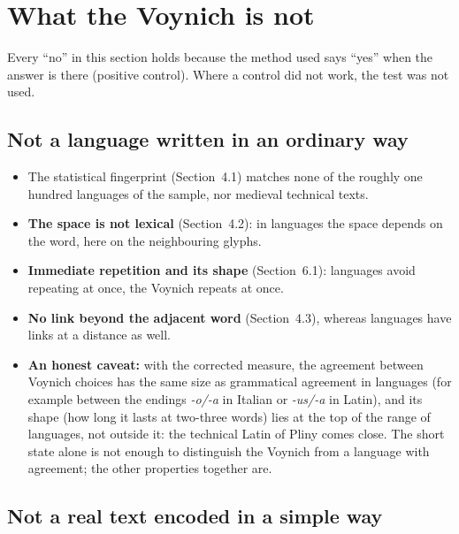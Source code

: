 \section{What the Voynich is not}

Every ``no'' in this section holds because the method used says ``yes'' when the answer is there (positive control).
Where a control did not work, the test was not used.

\subsection{Not a language written in an ordinary way}

\begin{itemize}
\item The statistical fingerprint (Section~4.1) matches none of the roughly one hundred languages of the sample, nor
  medieval technical texts.
\item \textbf{The space is not lexical} (Section~4.2): in languages the space depends on the word, here on the
  neighbouring glyphs.
\item \textbf{Immediate repetition and its shape} (Section~6.1): languages avoid repeating at once, the Voynich repeats at
  once.
\item \textbf{No link beyond the adjacent word} (Section~4.3), whereas languages have links at a distance as well.
\item \textbf{An honest caveat:} with the corrected measure, the agreement between Voynich choices has the same size as
  grammatical agreement in languages (for example between the endings \emph{-o/-a} in Italian or \emph{-us/-a} in Latin),
  and its shape (how long it lasts at two-three words) lies at the top of the range of languages, not outside it: the
  technical Latin of Pliny comes close. The short state alone is not enough to distinguish the Voynich from a language
  with agreement; the other properties together are.
\end{itemize}

\subsection{Not a real text encoded in a simple way}

